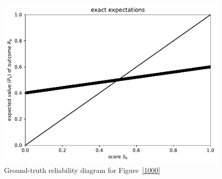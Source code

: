 \documentclass{article}
\begin{document}
\begin{figure}
\begin{centering}

\parbox{\imsize}{\includegraphics[width=\imsize]
                {./codes/unweighted/1000_10_0_0/exact.pdf}}

\end{centering}
\caption{Ground-truth reliability diagram for Figure~\ref{1000}}
\label{1000e}
\end{figure}
\end{document}
